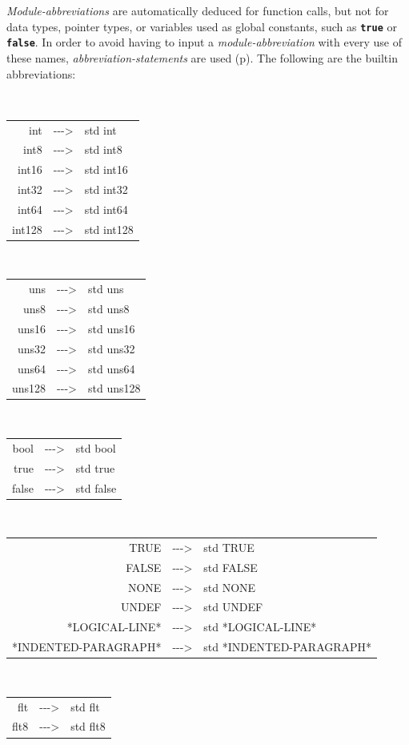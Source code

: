 \documentclass[12pt]{article}
\newcommand{\TT}[1]{{\tt \bfseries #1}}
\newcommand{\ABV}{-{}-{}->}
\newcommand{\pagref}[1]{p\pageref{#1}}
\begin{document}
{\em Module-abbreviations} are automatically deduced for function
calls, but not for data types, pointer types, or variables used
as global constants, such as \TT{true} or \TT{false}.
In order to avoid having to
input a {\em module-abbreviation} with every use of these names,
{\em abbreviation-statements} are used (\pagref{ABBREVIATION-STATEMENT}).
The following are the builtin abbreviations:
\begin{center}
\tt
\begin{tabular}{rcl}
int		& \ABV & std int \\
int8		& \ABV & std int8 \\
int16		& \ABV & std int16 \\
int32		& \ABV & std int32 \\
int64		& \ABV & std int64 \\
int128		& \ABV & std int128
\end{tabular}
\\[1ex]
\begin{tabular}{rcl}
uns		& \ABV & std uns \\
uns8		& \ABV & std uns8 \\
uns16		& \ABV & std uns16 \\
uns32		& \ABV & std uns32 \\
uns64		& \ABV & std uns64 \\
uns128		& \ABV & std uns128
\end{tabular}
\\[1ex]
\begin{tabular}{rcl}
bool		& \ABV & std bool \\
true		& \ABV & std true \\
false		& \ABV & std false
\end{tabular}
\\[1ex]
\begin{tabular}{rcl}
TRUE		& \ABV & std TRUE \\
FALSE		& \ABV & std FALSE \\
NONE		& \ABV & std NONE \\
UNDEF		& \ABV & std UNDEF \\
*LOGICAL-LINE*		& \ABV & std *LOGICAL-LINE* \\
*INDENTED-PARAGRAPH*	& \ABV & std *INDENTED-PARAGRAPH* \\
\end{tabular}
\\[1ex]
\begin{tabular}{rcl}
flt		& \ABV & std flt \\
flt8		& \ABV & std flt8 \\

\end{tabular}
\end{center}
\end{document}
